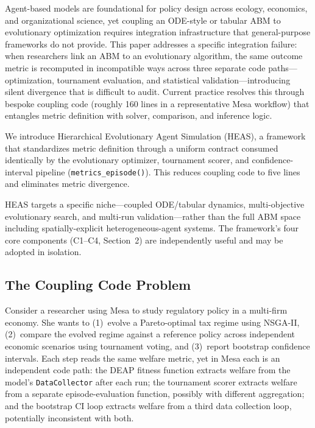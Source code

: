 \documentclass{wscpaperproc}
\begin{document}
Agent-based models are foundational for policy design across ecology,
economics, and organizational science, yet coupling an ODE-style or tabular ABM
to evolutionary optimization requires integration infrastructure that
general-purpose frameworks do not provide. This paper addresses a specific
integration failure: when researchers link an ABM to an evolutionary algorithm,
the same outcome metric is recomputed in incompatible ways across three separate
code paths---optimization, tournament evaluation, and statistical
validation---introducing silent divergence that is difficult to audit. Current
practice resolves this through bespoke coupling code (roughly 160 lines in a
representative Mesa workflow) that entangles metric definition with solver,
comparison, and inference logic.

We introduce Hierarchical Evolutionary Agent Simulation (HEAS), a framework that standardizes metric definition through a
uniform contract consumed identically by the evolutionary optimizer, tournament
scorer, and confidence-interval pipeline (\texttt{metrics\_episode()}).
This reduces coupling code to five lines and eliminates metric divergence.

HEAS targets a specific niche---coupled ODE/tabular dynamics, multi-objective
evolutionary search, and multi-run validation---rather than the full ABM space
including spatially-explicit heterogeneous-agent systems. The framework's four
core components (C1--C4, Section~2) are independently useful and may be adopted
in isolation.

\subsection{The Coupling Code Problem}

Consider a researcher using Mesa to study regulatory policy in a multi-firm
economy. She wants to (1)~evolve a Pareto-optimal tax regime using NSGA-II,
(2)~compare the evolved regime against a reference policy across independent
economic scenarios using tournament voting, and (3)~report bootstrap confidence
intervals. Each step reads the same welfare metric, yet in Mesa each is an
independent code path: the DEAP fitness function extracts welfare from the
model's \texttt{DataCollector} after each run; the tournament scorer extracts
welfare from a separate episode-evaluation function, possibly with different
aggregation; and the bootstrap CI loop extracts welfare from a third data
collection loop, potentially inconsistent with both.
\end{document}

